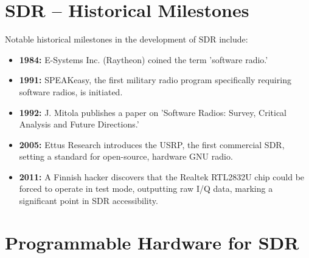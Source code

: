 \begin{center}

\end{center}









\section*{SDR – Historical Milestones}

Notable historical milestones in the development of SDR include:
\begin{itemize}
    \item \textbf{1984:} E-Systems Inc. (Raytheon) coined the term 'software radio.'
    \item \textbf{1991:} SPEAKeasy, the first military radio program specifically requiring software radios, is initiated.
    \item \textbf{1992:} J. Mitola publishes a paper on 'Software Radios: Survey, Critical Analysis and Future Directions.'
    \item \textbf{2005:} Ettus Research introduces the USRP, the first commercial SDR, setting a standard for open-source, hardware GNU radio.
    \item \textbf{2011:} A Finnish hacker discovers that the Realtek RTL2832U chip could be forced to operate in test mode, outputting raw I/Q data, marking a significant point in SDR accessibility.
\end{itemize}


\section*{Programmable Hardware for SDR}

